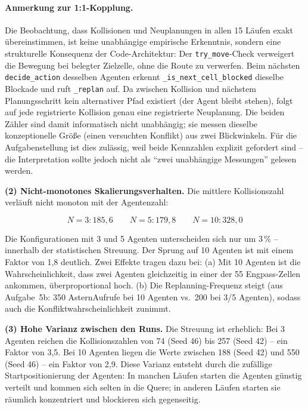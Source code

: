 \paragraph{Anmerkung zur 1:1-Kopplung.}
Die Beobachtung, dass Kollisionen und Neuplanungen in allen 15 L\"aufen exakt \"ubereinstimmen, ist keine unabh\"angige empirische Erkenntnis, sondern eine strukturelle Konsequenz der Code-Architektur: Der \texttt{try\_move}-Check verweigert die Bewegung bei belegter Zielzelle, ohne die Route zu verwerfen. Beim n\"achsten \texttt{decide\_action} desselben Agenten erkennt \texttt{\_is\_next\_cell\_blocked} dieselbe Blockade und ruft \texttt{\_replan} auf. Da zwischen Kollision und n\"achstem Planungsschritt kein alternativer Pfad existiert (der Agent bleibt stehen), folgt auf jede registrierte Kollision genau eine registrierte Neuplanung. Die beiden Z\"ahler sind damit informatisch nicht unabh\"angig; sie messen dieselbe konzeptionelle Gr\"o\ss{}e (einen versuchten Konflikt) aus zwei Blickwinkeln. F\"ur die Aufgabenstellung ist dies zul\"assig, weil beide Kennzahlen explizit gefordert sind -- die Interpretation sollte jedoch nicht als \enquote{zwei unabh\"angige Messungen} gelesen werden.

\textbf{(2) Nicht-monotones Skalierungsverhalten.}
Die mittlere Kollisionszahl verläuft nicht monoton mit der Agentenzahl:

\[
N=3: 185{,}6 \qquad N=5: 179{,}8 \qquad N=10: 328{,}0
\]

Die Konfigurationen mit 3 und 5 Agenten unterscheiden sich nur um 3\,\% -- innerhalb der statistischen Streuung. Der Sprung auf 10 Agenten ist mit einem Faktor von 1{,}8 deutlich. Zwei Effekte tragen dazu bei: (a) Mit 10 Agenten ist die Wahrscheinlichkeit, dass zwei Agenten gleichzeitig in einer der 55 Engpass-Zellen ankommen, überproportional hoch. (b) Die Replanning-Frequenz steigt (aus Aufgabe~5b: 350 \acs{Astern}Aufrufe bei 10 Agenten vs.~200 bei 3/5 Agenten), sodass auch die Konfliktwahrscheinlichkeit zunimmt.

\textbf{(3) Hohe Varianz zwischen den Runs.}
Die Streuung ist erheblich: Bei 3 Agenten reichen die Kollisionszahlen von 74 (Seed 46) bis 257 (Seed 42) -- ein Faktor von 3{,}5. Bei 10 Agenten liegen die Werte zwischen 188 (Seed 42) und 550 (Seed 46) -- ein Faktor von 2{,}9. Diese Varianz entsteht durch die zufällige Startpositionierung der Agenten: In manchen Läufen starten die Agenten günstig verteilt und kommen sich selten in die Quere; in anderen Läufen starten sie räumlich konzentriert und blockieren sich gegenseitig.

